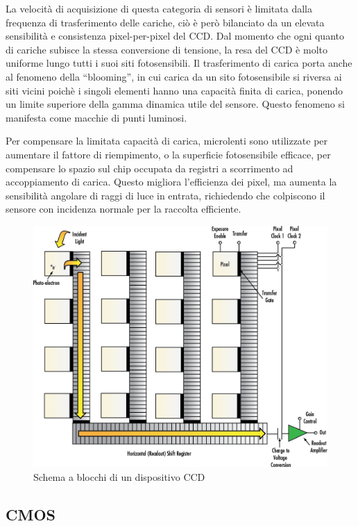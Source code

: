 La velocità di acquisizione di questa categoria di sensori è limitata dalla
frequenza di trasferimento delle cariche, ciò è però bilanciato da un elevata
sensibilità e consistenza pixel-per-pixel del CCD. Dal momento che ogni quanto
di cariche subisce la stessa conversione di tensione, la resa del CCD è molto
uniforme lungo tutti i suoi siti fotosensibili. Il trasferimento di carica
porta anche al fenomeno della ``blooming'', in cui carica da un sito
fotosensibile si riversa ai siti vicini poichè i singoli elementi hanno una
capacità finita di carica, ponendo un limite superiore della gamma dinamica
utile del sensore. Questo fenomeno si manifesta come macchie di punti
luminosi.

Per compensare la limitata capacità di carica, microlenti sono utilizzate per
aumentare il fattore di riempimento, o la superficie fotosensibile efficace,
per compensare lo spazio sul chip occupata da registri a scorrimento ad
accoppiamento di carica. Questo migliora l'efficienza dei pixel, ma aumenta la
sensibilità angolare di raggi di luce in entrata, richiedendo che colpiscono
il sensore con incidenza normale per la raccolta efficiente.



\begin{figure}[!ht]
\centering

\includegraphics[width=.6\textwidth]{img/ccd-blockdiagram.jpeg}

\caption{Schema a blocchi di un dispositivo CCD}
\label{fig:ccd-blockdiagram}
\end{figure}

\subsection{CMOS}


